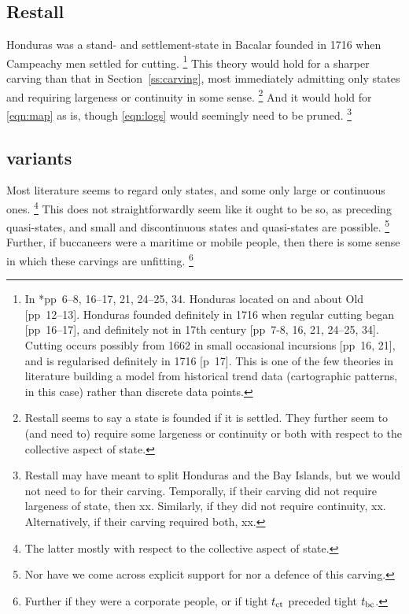 	\subsection{Restall}
	\label{ss:restall}
		Honduras was a stand- and settlement-state in Bacalar founded in 1716 when Campeachy men settled for cutting.%
		\footnote{In \cite{res19}*{pp~6--8, 16--17, 21, 24--25, 34}. Honduras located on and about Old [pp~12--13]. Honduras founded definitely in 1716 when regular cutting began [pp~16--17], and definitely not in 17th century [pp~7-8, 16, 21, 24--25, 34]. Cutting occurs possibly from 1662 in small occasional incursions [pp~16, 21], and is regularised definitely in 1716 [p~17]. This is one of the few theories in literature building a model from historical trend data (cartographic patterns, in this case) rather than discrete data points.} %
		This theory would hold for a sharper carving than that in Section~\ref{ss:carving}, most immediately admitting only states and requiring largeness or continuity in some sense.%
		\footnote{Restall seems to say a state is founded if it is settled. They further seem to (and need to) require some largeness or continuity or both with respect to the collective aspect of state.}
		And it would hold for \ref{eqn:map} as is, though \ref{eqn:logs} would seemingly need to be pruned.%
		\footnote{Restall may have meant to split Honduras and the Bay Islands, but we would not need to for their carving. Temporally, if their carving did not require largeness of state, then xx. Similarly, if they did not require continuity, xx. Alternatively, if their carving required both, xx.}
	\subsection{ variants}
	\label{ss:possypolities}
		Most literature seems to regard only states, and some only large or continuous ones.%
		\footnote{The latter mostly with respect to the collective aspect of state.}
		This does not straightforwardly seem like it ought to be so, as preceding quasi-states, and small and discontinuous states and quasi-states are possible.%
		\footnote{Nor have we come across explicit support for nor a defence of this carving.}
		Further, if buccaneers were a maritime or mobile people, then there is some sense in which these carvings are unfitting.%
		\footnote{Further if they were a corporate people, or if tight \(t_{\operatorname{ct}}\) preceded tight \(t_{\operatorname{bc}}\).}
